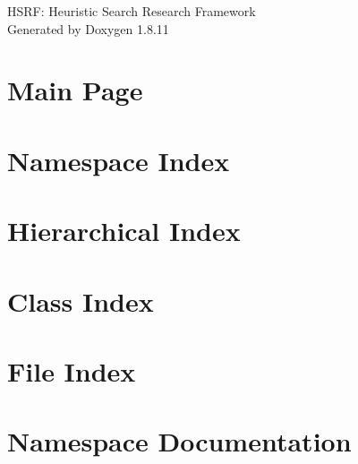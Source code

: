 \documentclass[twoside]{article}
\newcommand{\+}{\discretionary{\mbox{\scriptsize$\hookleftarrow$}}{}{}}
\begin{document}
\hypersetup{pageanchor=false,
             bookmarksnumbered=true,
             pdfencoding=unicode
            }
\begin{titlepage}
\vspace*{7cm}
\begin{center}%
{\Large H\+S\+RF\+: Heuristic Search Research Framework }\\
\vspace*{1cm}
{\large Generated by Doxygen 1.8.11}\\
\end{center}
\end{titlepage}
\tableofcontents
{}
\hypersetup{pageanchor=true}

\section{Main Page}
\label{index}\hypertarget{index}{}
\section{Namespace Index}

\section{Hierarchical Index}

\section{Class Index}

\section{File Index}

\section{Namespace Documentation}




























\end{document}
